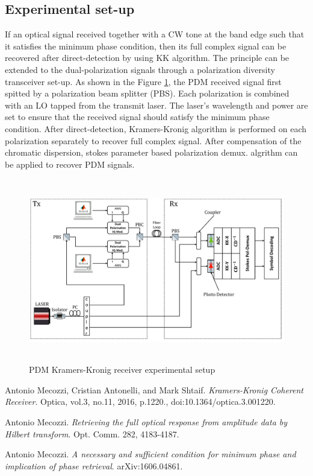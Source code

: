 \subsection{Experimental set-up}
If an optical signal received together with a CW tone at the band edge such that it satisfies the minimum phase condition, then its full complex signal can be recovered after direct-detection by using KK algorithm. The principle can be extended to the dual-polarization signals through a polarization diversity transceiver set-up. As shown in the Figure \ref{Practical_setup_TxRx}, the PDM received signal first spitted by a polarization beam splitter (PBS). Each polarization is combined with an LO tapped from the transmit laser. The laser's wavelength and power are set to ensure that the received signal should satisfy the minimum phase condition. After direct-detection, Kramers-Kronig algorithm is performed on each polarization separately to recover full complex signal. After compensation of the chromatic dispersion, stokes parameter based polarization demux. algrithm can be applied to recover PDM signals.     

\begin{figure}[h]
	\centering
	\includegraphics[width=1.0\textwidth, height=8cm]{./sdf/simplified_coherent_receiver/figures/Practical_setup_TxRx.pdf}
	\caption{PDM Kramers-Kronig receiver experimental setup}\label{Practical_setup_TxRx}
\end{figure}



\begin{thebibliography}{9}
	Antonio Mecozzi, Cristian Antonelli, and Mark Shtaif.
	\textit{Kramers-Kronig Coherent Receiver}.
	Optica, vol.3, no.11, 2016, p.1220., doi:10.1364/optica.3.001220.
	
	Antonio Mecozzi.
	\textit{Retrieving the full optical response from amplitude data by Hilbert transform}. Opt. Comm. 282, 4183-4187.
	
	Antonio Mecozzi.
	\textit{A necessary and sufficient condition for minimum phase and implication of phase retrieval}. arXiv:1606.04861.
\end{thebibliography}

